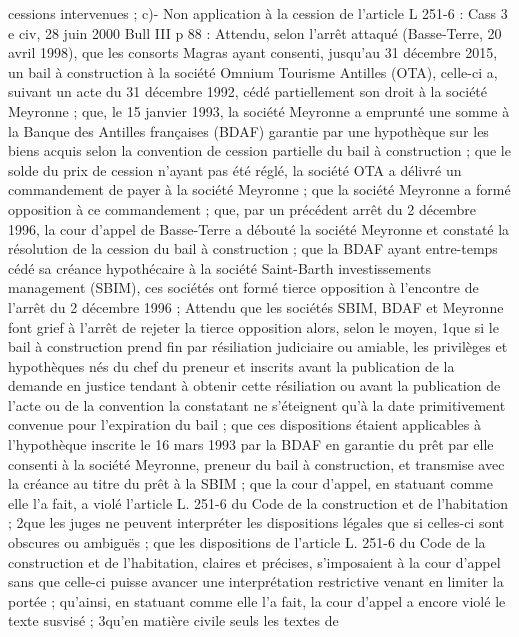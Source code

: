 \documentclass[11pt,a4paper]{report}
\begin{document}
	cessions intervenues ;
	c)- Non application à la cession de l’article L 251-6 : Cass 3 e civ, 28 juin 2000 Bull III  p 88 : Attendu,
	selon l'arrêt attaqué (Basse-Terre, 20 avril 1998), que les consorts Magras ayant consenti, jusqu'au 31
	décembre 2015, un bail à construction à la société Omnium Tourisme Antilles (OTA), celle-ci a, suivant un acte
	du 31 décembre 1992, cédé partiellement son droit à la société Meyronne ; que, le 15 janvier 1993, la société
	Meyronne a emprunté une somme à la Banque des Antilles françaises (BDAF) garantie par une hypothèque sur
	les biens acquis selon la convention de cession partielle du bail à construction ; que le solde du prix de cession
	n'ayant pas été réglé, la société OTA a délivré un commandement de payer à la société Meyronne ; que la
	société Meyronne a formé opposition à ce commandement ; que, par un précédent arrêt du 2 décembre 1996, la
	cour d'appel de Basse-Terre a débouté la société Meyronne et constaté la résolution de la cession du bail à
	construction ; que la BDAF ayant entre-temps cédé sa créance hypothécaire à la société Saint-Barth
	investissements management (SBIM), ces sociétés ont formé tierce opposition à l'encontre de l'arrêt du 2
	décembre 1996 ;
	Attendu que les sociétés SBIM, BDAF et Meyronne font grief à l'arrêt de rejeter la tierce opposition alors, selon
	le moyen, 1\degre  que si le bail à construction prend fin par résiliation judiciaire ou amiable, les privilèges et
	hypothèques nés du chef du preneur et inscrits avant la publication de la demande en justice tendant à obtenir
	cette résiliation ou avant la publication de l'acte ou de la convention la constatant ne s'éteignent qu'à la date
	primitivement convenue pour l'expiration du bail ; que ces dispositions étaient applicables à l'hypothèque
	inscrite le 16 mars 1993 par la BDAF en garantie du prêt par elle consenti à la société Meyronne, preneur du
	bail à construction, et transmise avec la créance au titre du prêt à la SBIM ; que la cour d'appel, en statuant
	comme elle l'a fait, a violé l'article L. 251-6 du Code de la construction et de l'habitation ; 2\degre  que les juges ne
	peuvent interpréter les dispositions légales que si celles-ci sont obscures ou ambiguës ; que les dispositions de
	l'article L. 251-6 du Code de la construction et de l'habitation, claires et précises, s'imposaient à la cour d'appel
	sans que celle-ci puisse avancer une interprétation restrictive venant en limiter la portée ; qu'ainsi, en statuant
	comme elle l'a fait, la cour d'appel a encore violé le texte susvisé ; 3\degre  qu'en matière civile seuls les textes de
\end{document}
